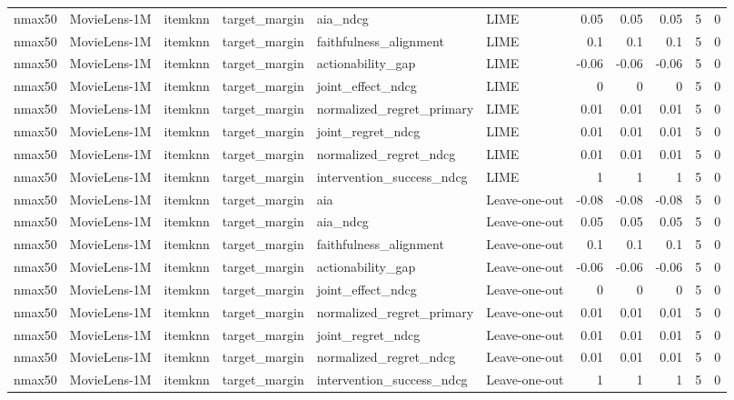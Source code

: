 \begin{table}[t]
{\begin{tabular}{llllllrrrrr}
nmax50 & MovieLens-1M & itemknn & target\_margin & aia\_ndcg & LIME & 0.05 & 0.05 & 0.05 & 5 & 0 \\
nmax50 & MovieLens-1M & itemknn & target\_margin & faithfulness\_alignment & LIME & 0.1 & 0.1 & 0.1 & 5 & 0 \\
nmax50 & MovieLens-1M & itemknn & target\_margin & actionability\_gap & LIME & -0.06 & -0.06 & -0.06 & 5 & 0 \\
nmax50 & MovieLens-1M & itemknn & target\_margin & joint\_effect\_ndcg & LIME & 0 & 0 & 0 & 5 & 0 \\
nmax50 & MovieLens-1M & itemknn & target\_margin & normalized\_regret\_primary & LIME & 0.01 & 0.01 & 0.01 & 5 & 0 \\
nmax50 & MovieLens-1M & itemknn & target\_margin & joint\_regret\_ndcg & LIME & 0.01 & 0.01 & 0.01 & 5 & 0 \\
nmax50 & MovieLens-1M & itemknn & target\_margin & normalized\_regret\_ndcg & LIME & 0.01 & 0.01 & 0.01 & 5 & 0 \\
nmax50 & MovieLens-1M & itemknn & target\_margin & intervention\_success\_ndcg & LIME & 1 & 1 & 1 & 5 & 0 \\
nmax50 & MovieLens-1M & itemknn & target\_margin & aia & Leave-one-out & -0.08 & -0.08 & -0.08 & 5 & 0 \\
nmax50 & MovieLens-1M & itemknn & target\_margin & aia\_ndcg & Leave-one-out & 0.05 & 0.05 & 0.05 & 5 & 0 \\
nmax50 & MovieLens-1M & itemknn & target\_margin & faithfulness\_alignment & Leave-one-out & 0.1 & 0.1 & 0.1 & 5 & 0 \\
nmax50 & MovieLens-1M & itemknn & target\_margin & actionability\_gap & Leave-one-out & -0.06 & -0.06 & -0.06 & 5 & 0 \\
nmax50 & MovieLens-1M & itemknn & target\_margin & joint\_effect\_ndcg & Leave-one-out & 0 & 0 & 0 & 5 & 0 \\
nmax50 & MovieLens-1M & itemknn & target\_margin & normalized\_regret\_primary & Leave-one-out & 0.01 & 0.01 & 0.01 & 5 & 0 \\
nmax50 & MovieLens-1M & itemknn & target\_margin & joint\_regret\_ndcg & Leave-one-out & 0.01 & 0.01 & 0.01 & 5 & 0 \\
nmax50 & MovieLens-1M & itemknn & target\_margin & normalized\_regret\_ndcg & Leave-one-out & 0.01 & 0.01 & 0.01 & 5 & 0 \\
nmax50 & MovieLens-1M & itemknn & target\_margin & intervention\_success\_ndcg & Leave-one-out & 1 & 1 & 1 & 5 & 0 \\

\end{tabular}}
\end{table}
